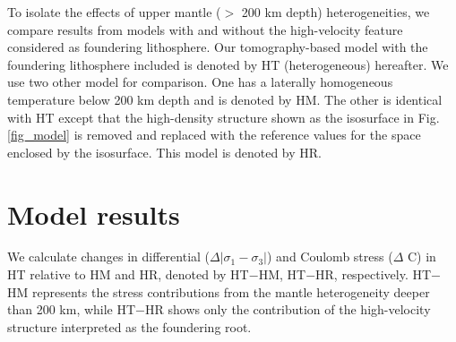 \documentclass[draft,linenumbers]{agujournal2018}
\begin{document}
To isolate the effects of upper mantle ($>$ 200 km depth) heterogeneities, we compare results from models with and without the high-velocity feature considered as foundering lithosphere. Our tomography-based model with the foundering lithosphere included is denoted by HT (heterogeneous) hereafter. We use two other model for comparison. One has a laterally homogeneous temperature below 200 km depth and is denoted by HM. The other is identical with HT except that the high-density structure shown as the isosurface in Fig. \ref{fig_model} is removed and replaced with the reference values for the space enclosed by the isosurface. This model is denoted by HR.

\section{Model results}
We calculate changes in differential ($\Delta|\sigma_1 - \sigma_3|$) and Coulomb stress ($\Delta$ C) in HT relative to HM and HR, denoted by HT$-$HM, HT$-$HR, respectively. HT$-$HM represents the stress contributions from the mantle heterogeneity deeper than 200 km, while HT$-$HR shows only the contribution of the high-velocity structure interpreted as the foundering root. 
\end{document}
